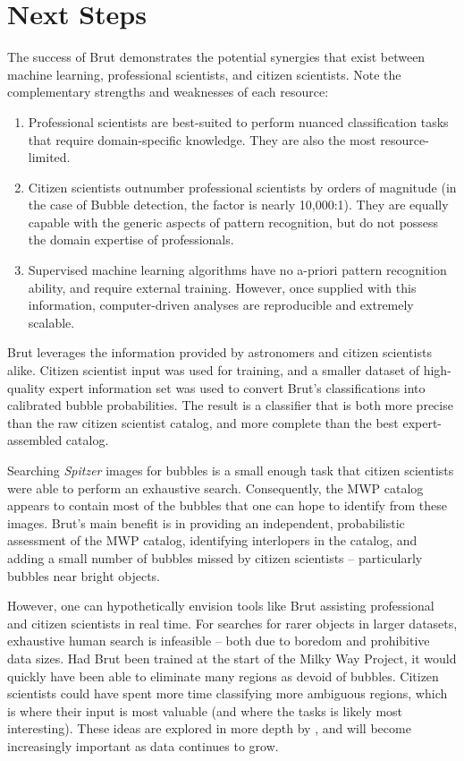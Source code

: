 \section{Next Steps}
\label{sec:next_steps}
The success of Brut demonstrates the potential synergies that exist between machine learning, professional scientists, and citizen scientists. Note the complementary strengths and weaknesses of each resource:

\begin{enumerate}
\item Professional scientists are best-suited to perform nuanced classification tasks that require domain-specific knowledge. They are also the most resource-limited.
\item Citizen scientists outnumber professional scientists by orders of magnitude (in the case of Bubble detection, the factor is nearly 10,000:1). They are equally capable with the generic aspects of pattern recognition, but do not possess the domain expertise of professionals.
\item Supervised machine learning algorithms have no a-priori pattern recognition ability, and require external training. However, once supplied with this information, computer-driven analyses are reproducible and extremely scalable.
\end{enumerate}

Brut leverages the information provided by astronomers and citizen scientists alike. Citizen scientist input was used for training, and a smaller dataset of high-quality expert information set was used to convert Brut's classifications into calibrated bubble probabilities. The result is a classifier that is both more precise than the raw citizen scientist catalog, and more complete than the best expert-assembled catalog.

Searching \emph{Spitzer} images for bubbles is a small enough task that citizen scientists were able to perform an exhaustive search. Consequently, the MWP catalog appears to contain most of the bubbles that one can hope to identify from these images. Brut's main benefit is in providing an independent, probabilistic assessment of the MWP catalog, identifying interlopers in the catalog, and adding a small number of bubbles missed by citizen scientists -- particularly bubbles near bright objects.

However, one can hypothetically envision tools like Brut assisting professional and citizen scientists in real time. For searches for rarer objects in larger datasets, exhaustive human search is infeasible -- both due to boredom and prohibitive data sizes. Had Brut been trained at the start of the Milky Way Project, it would quickly have been able to eliminate many regions as devoid of bubbles. Citizen scientists could have spent more time classifying more ambiguous regions, which is where their input is most valuable (and where the tasks is likely most interesting). These ideas are explored in more depth by \cite{MSR}, and will become increasingly important as data continues to grow.

